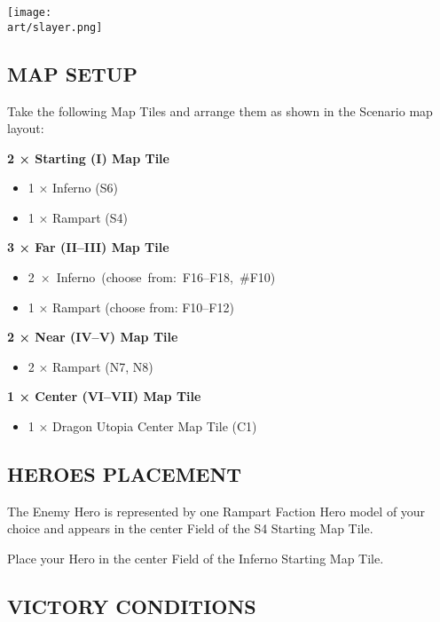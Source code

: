 \begin{multicols*}{2}
\begin{center}
  {\texttt{[image: \\art/slayer.png]}}
\end{center}

\subsection*{\MakeUppercase{Map Setup}}

Take the following Map Tiles and arrange them as shown in the Scenario map layout:

\textbf{2 × Starting (I) Map Tile}
\begin{itemize}
  \item 1 × Inferno (S6)
  \item 1 × Rampart (S4)
\end{itemize}

\textbf{3 × Far (II--III) Map Tile}
\begin{itemize}
  \item \mbox{2 × Inferno (choose from: F16--F18, \#F10)}
  \item 1 × Rampart (choose from: F10--F12)
\end{itemize}

\textbf{2 × Near (IV--V) Map Tile}
\begin{itemize}
  \item 2 × Rampart (N7, N8)
\end{itemize}

\textbf{1 × Center (VI--VII) Map Tile}
\begin{itemize}
  \item 1 × Dragon Utopia Center Map Tile (C1)
\end{itemize}

\subsection*{\MakeUppercase{Heroes Placement}}

The Enemy Hero is represented by one Rampart Faction Hero model of your choice
and appears in the center Field of the S4 Starting Map Tile.

Place your Hero in the center Field of the Inferno Starting Map Tile.

\subsection*{\MakeUppercase{Victory Conditions}}


\end{multicols*}
